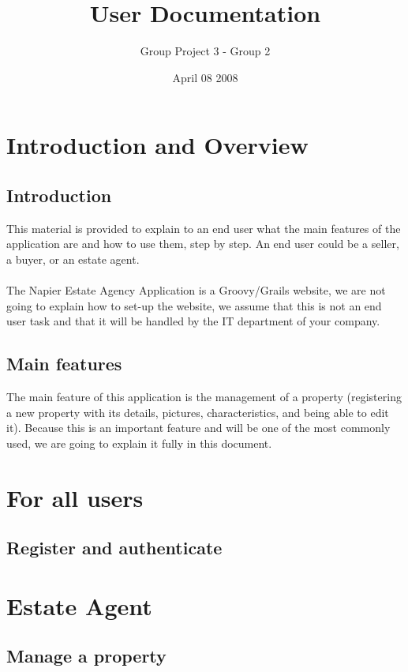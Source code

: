 \documentclass[a4paper,12pt]{article}
\title{User Documentation}
\author{Group Project 3 - Group 2}
\date{April 08 2008}
\begin{document}
\maketitle
\newpage
\tableofcontents
\newpage



\section{Introduction and Overview}
\subsection{Introduction}
This material is provided to explain to an end user what the main features of the application are and how to use them, step by step.
An end user could be a seller, a buyer, or an estate agent.

\paragraph{}
The Napier Estate Agency Application is a Groovy/Grails website, we are not going to explain how to set-up the website,
we assume that this is not an end user task and that it will be handled by the IT department of your company.

\subsection{Main features}
The main feature of this application is the management of a property (registering a new property with its details, pictures, characteristics, and being able to edit it).
Because this is an important feature and will be one of the most commonly used, we are going to explain it fully in this document.

\section{For all users}
\subsection{Register and authenticate}

\section{Estate Agent}
\subsection{Manage a property}
\end{document}
